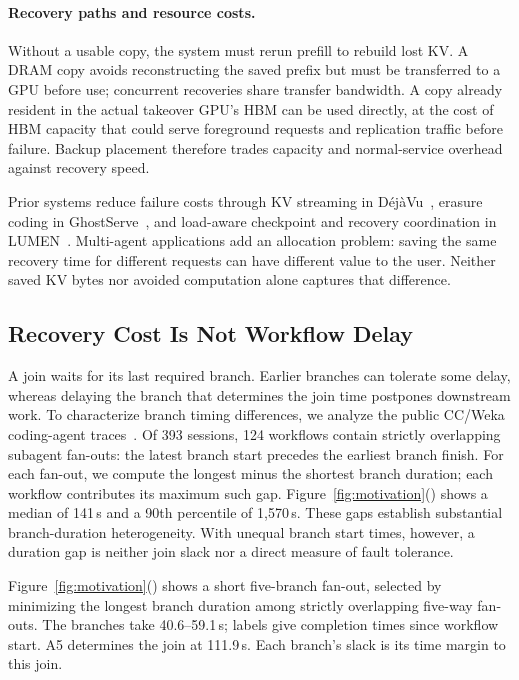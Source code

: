 \paragraph{Recovery paths and resource costs.}
Without a usable copy, the system must rerun prefill to rebuild lost KV.
A DRAM copy avoids reconstructing the saved prefix but must be transferred
to a GPU before use; concurrent recoveries share transfer bandwidth.
A copy already resident in the actual takeover GPU's HBM can be used
directly, at the cost of HBM capacity that could serve foreground requests
and replication traffic before failure. Backup placement therefore trades
capacity and normal-service overhead against recovery speed.

Prior systems reduce failure costs through KV streaming in
D\'{e}j\`{a}Vu~\cite{strati2024dejavu}, erasure coding in
GhostServe~\cite{jayakody2026ghostserve}, and load-aware checkpoint and
recovery coordination in LUMEN~\cite{cao2026lumen}. Multi-agent
applications add an allocation problem: saving the same recovery time for
different requests can have different value to the user. Neither saved KV
bytes nor avoided computation alone captures that difference.

\subsection{Recovery Cost Is Not Workflow Delay}
\label{sec:motivation-workflow}

A join waits for its last required branch. Earlier branches can tolerate
some delay, whereas delaying the branch that determines the join time
postpones downstream work. To characterize branch timing differences, we
analyze the public CC/Weka coding-agent
traces~\cite{semianalysis2026cctraces}. Of 393 sessions, 124 workflows
contain strictly overlapping subagent fan-outs: the latest branch start
precedes the earliest branch finish. For each fan-out, we compute the
longest minus the shortest branch duration; each workflow contributes its
maximum such gap. Figure~\ref{fig:motivation}() shows a median of
141\,s and a 90th percentile of 1,570\,s. These gaps establish substantial
branch-duration heterogeneity. With unequal branch start times, however,
a duration gap is neither join slack nor a direct measure of fault tolerance.

Figure~\ref{fig:motivation}() shows a short
five-branch fan-out, selected by minimizing the longest branch duration
among strictly overlapping five-way fan-outs. The branches take
40.6--59.1\,s; labels give completion times since workflow start.
A5 determines the join at 111.9\,s. Each branch's slack is its time
margin to this join.


